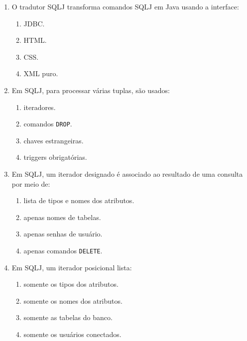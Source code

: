 \documentclass[12pt,a4paper]{article}
\begin{document}
\begin{enumerate}[label=\textbf{Q\arabic*.}]
\begin{enumerate}[label=\alph*)]
    \item um padrão para embutir SQL em Java.
    \item uma linguagem para apagar bancos.
    \item uma forma de criptografia de senha.
    \item um tipo de chave estrangeira.
\end{enumerate}

\item O tradutor SQLJ transforma comandos SQLJ em Java usando a interface:

\begin{enumerate}[label=\alph*)]
    \item JDBC.
    \item HTML.
    \item CSS.
    \item XML puro.
\end{enumerate}

\item Em SQLJ, para processar várias tuplas, são usados:

\begin{enumerate}[label=\alph*)]
    \item iteradores.
    \item comandos \texttt{DROP}.
    \item chaves estrangeiras.
    \item triggers obrigatórias.
\end{enumerate}

\item Em SQLJ, um iterador designado é associado ao resultado de uma consulta por meio de:

\begin{enumerate}[label=\alph*)]
    \item lista de tipos e nomes dos atributos.
    \item apenas nomes de tabelas.
    \item apenas senhas de usuário.
    \item apenas comandos \texttt{DELETE}.
\end{enumerate}

\item Em SQLJ, um iterador posicional lista:

\begin{enumerate}[label=\alph*)]
    \item somente os tipos dos atributos.
    \item somente os nomes dos atributos.
    \item somente as tabelas do banco.
    \item somente os usuários conectados.
\end{enumerate}


\end{enumerate}
\end{document}
